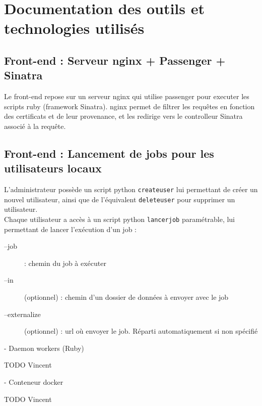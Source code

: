 \newpage

\chapter{Documentation des outils et technologies utilisés}

\section{Front-end : Serveur nginx + Passenger + Sinatra}

Le front-end repose sur un serveur nginx qui utilise passenger pour executer les scripts ruby (framework Sinatra).
nginx permet de filtrer les requêtes en fonction des certificats et de leur provenance, et les redirige vers le controlleur Sinatra associé à la requête.

\section{Front-end : Lancement de jobs pour les utilisateurs locaux} 

L'administrateur possède un script python {\tt createuser} lui permettant de créer un nouvel utilisateur, ainsi que de l'équivalent {\tt deleteuser} pour supprimer un utilisateur. \\

Chaque utilisateur a accès à un script python {\tt lancerjob} paramétrable, lui permettant de lancer l'exécution d'un job :\\
\begin{description}
	\item[--job] : chemin du job à exécuter
	\item[--in] (optionnel) : chemin d'un dossier de données à envoyer avec le job
	\item[--externalize] (optionnel) : url où envoyer le job. Réparti automatiquement si non spécifié
\end{description}

- Daemon workers (Ruby) 

TODO Vincent

- Conteneur docker

TODO Vincent
